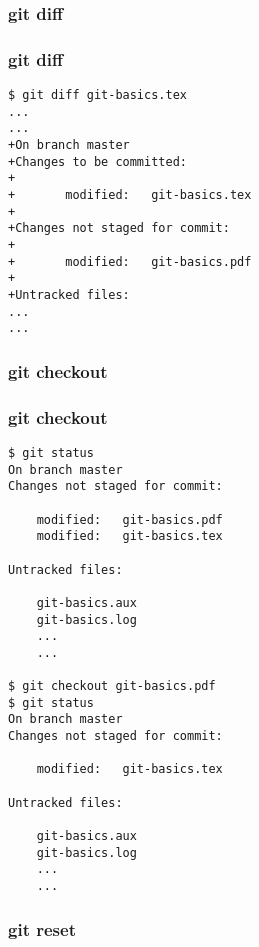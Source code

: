 \documentclass{beamer}
\begin{document}

\begin{frame}
\frametitle{git diff}

\end{frame}


\begin{frame}[fragile]
\frametitle{git diff}
	\tiny
	\begin{verbatim}
$ git diff git-basics.tex
...
...
+On branch master
+Changes to be committed:
+
+       modified:   git-basics.tex
+
+Changes not staged for commit:
+
+       modified:   git-basics.pdf
+
+Untracked files:
...
...
	\end{verbatim}
\end{frame}



\begin{frame}
\frametitle{git checkout}

\end{frame}


\begin{frame}[fragile]
\frametitle{git checkout}
	\tiny
	\begin{verbatim}
$ git status
On branch master
Changes not staged for commit:

	modified:   git-basics.pdf
	modified:   git-basics.tex

Untracked files:

	git-basics.aux
	git-basics.log
	...
	...

$ git checkout git-basics.pdf
$ git status
On branch master
Changes not staged for commit:

	modified:   git-basics.tex

Untracked files:

	git-basics.aux
	git-basics.log
	...
	...

	\end{verbatim}
\end{frame}


\begin{frame}
\frametitle{git reset}

\end{frame}

\end{document}

